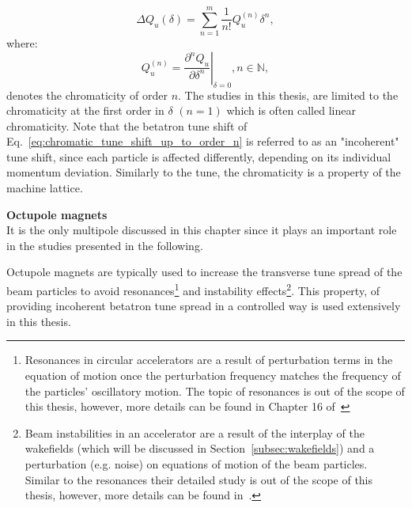 
\begin{equation}\label{eq:chromatic_tune_shift_up_to_order_n}
   \Delta Q_u (\delta) = \sum_{n=1}^m \frac{1}{n!} Q_u^{(n)} \delta^n, 
\end{equation}
where:
\begin{equation}\label{eq:chroma_up_to_order_m}
    Q_u^{(n)} = \left. \frac{\partial ^n Q_u}{\partial \delta^n} \right|_{\delta=0}, n \in \mathbb{N},
 \end{equation}
denotes the chromaticity of order $n$. The studies in this thesis, are limited to the chromaticity at the first order in $\delta$ $(n=1)$ which is often called linear chromaticity. Note that the betatron tune shift of Eq.~\eqref{eq:chromatic_tune_shift_up_to_order_n} is referred to as an "incoherent" tune shift, since each particle is affected differently, depending on its individual momentum deviation. Similarly to the tune, the chromaticity is a property of the machine lattice. %



\textbf{Octupole magnets}\\
It is the only multipole discussed in this chapter since it plays an important role in the studies presented in the following.

Octupole magnets are typically used to increase the transverse tune spread of the beam particles to avoid resonances\footnote{Resonances in circular accelerators are a result of perturbation terms in the equation of motion once the perturbation frequency matches the frequency of the particles' oscillatory motion. The topic of resonances is out of the scope of this thesis, however, more details can be found in Chapter 16 of~\cite{Wiedemann:1083415}} and instability effects\footnote{Beam instabilities in an accelerator are a result of the interplay of the wakefields (which will be discussed in Section~\ref{subsec:wakefields}) and a perturbation (e.g. noise) on equations of motion of the beam particles. Similar to the resonances their detailed study is out of the scope of this thesis, however, more details can be found in~\cite{Rumolo:1982422}.}. This property, of providing incoherent betatron tune spread in a controlled way is used extensively in this thesis.%



